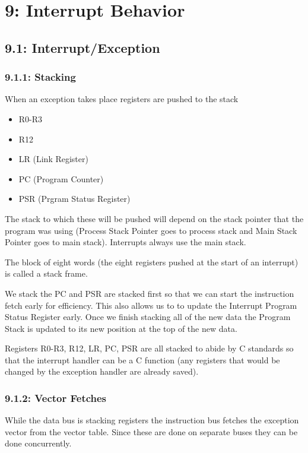 \documentclass[12pt]{article}
\begin{document}

\section*{9: Interrupt Behavior}
\subsection*{9.1: Interrupt/Exception}
\subsubsection*{9.1.1: Stacking}
When an exception takes place registers are pushed to the stack
\begin{itemize}
    \item R0-R3
    \item R12
    \item LR (Link Register)
    \item PC (Program Counter)
    \item PSR (Prgram Status Register)
\end{itemize}
The stack to which these will be pushed will depend on the stack pointer that the program was using (Process Stack Pointer goes to process stack and Main Stack Pointer goes to main stack). Interrupts always use the main stack.

The block of eight words (the eight registers pushed at the start of an interrupt) is called a stack frame.

We stack the PC and PSR are stacked first so that we can start the instruction fetch early for efficiency. This also allows us to to update the Interrupt Program Status Register early. Once we finish stacking all of the new data the Program Stack is updated to its new position at the top of the new data.

Registers R0-R3, R12, LR, PC, PSR are all stacked to abide by C standards so that the interrupt handler can be a C function (any registers that would be changed by the exception handler are already saved).

\subsubsection*{9.1.2: Vector Fetches}
While the data bus is stacking registers the instruction bus fetches the exception vector from the vector table. Since these are done on separate buses they can be done concurrently.
\end{document}
